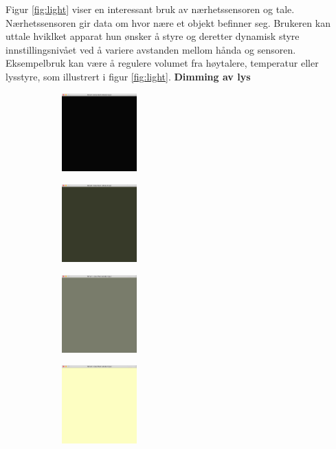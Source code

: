 Figur \ref{fig:light} viser en interessant bruk av nærhetssensoren og tale. Nærhetssensoren gir data om hvor nære et objekt befinner seg. Brukeren kan uttale hviklket apparat hun ønsker å styre og deretter dynamisk styre innstillingsnivået ved å variere avstanden mellom hånda og sensoren. Eksempelbruk kan være å regulere volumet fra høytalere, temperatur eller lysstyre, som illustrert i figur \ref{fig:light}.
\textbf{Dimming av lys}\newline
\begin{figure}[h]
\centering
\begin{subfigure}{0.19\textwidth}
\includegraphics[width=3cm, height=3cm]{fig/light-1}
\caption{}
\label{fig:light-1}
\end{subfigure}
\begin{subfigure}{0.19\textwidth}
\includegraphics[width=3cm, height=3cm]{fig/light-2}
\caption{}
\label{fig:light-2}
\end{subfigure}
\begin{subfigure}{0.19\textwidth}
\includegraphics[width=3cm, height=3cm]{fig/light-3}
\caption{}
\label{fig:light-3}
\end{subfigure}
\begin{subfigure}{0.19\textwidth}
\includegraphics[width=3cm, height=3cm]{fig/light-4}

\end{subfigure}
\end{figure}
